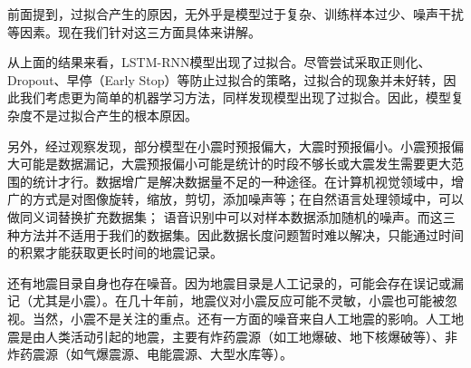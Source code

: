 前面提到，过拟合产生的原因，无外乎是模型过于复杂、训练样本过少、噪声干扰等因素。现在我们针对这三方面具体来讲解。

从上面的结果来看，LSTM-RNN模型出现了过拟合。尽管尝试采取正则化、Dropout、早停（Early Stop）等防止过拟合的策略，过拟合的现象并未好转，因此我们考虑更为简单的机器学习方法，同样发现模型出现了过拟合。因此，模型复杂度不是过拟合产生的根本原因。

另外，经过观察发现，部分模型在小震时预报偏大，大震时预报偏小。小震预报偏大可能是数据漏记，大震预报偏小可能是统计的时段不够长或大震发生需要更大范围的统计才行。数据增广是解决数据量不足的一种途径。在计算机视觉领域中，增广的方式是对图像旋转，缩放，剪切，添加噪声等；在自然语言处理领域中，可以做同义词替换扩充数据集；
语音识别中可以对样本数据添加随机的噪声。而这三种方法并不适用于我们的数据集。因此数据长度问题暂时难以解决，只能通过时间的积累才能获取更长时间的地震记录。

还有地震目录自身也存在噪音。因为地震目录是人工记录的，可能会存在误记或漏记（尤其是小震）。在几十年前，地震仪对小震反应可能不灵敏，小震也可能被忽视。当然，小震不是关注的重点。还有一方面的噪音来自人工地震的影响。人工地震是由人类活动引起的地震，主要有炸药震源（如工地爆破、地下核爆破等）、非炸药震源（如气爆震源、电能震源、大型水库等）。



  

